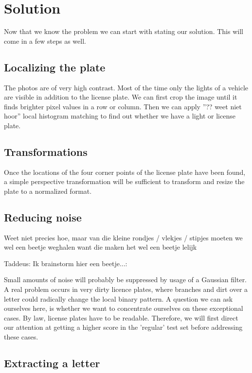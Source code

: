 \documentclass[a4paper]{article}
\begin{document}
\section{Solution}

Now that we know the problem we can start with stating our solution. This will
come in a few steps as well.

\subsection{Localizing the plate}

The photos are of very high contrast. Most of the time only the lights of a vehicle
are visible in addition to the license plate. We can first crop the image until
it finds brighter pixel values in a row or column. Then we can apply ''?? weet niet hoor'' local histogram
matching to find out whether we have a light or license plate.

\subsection{Transformations}

Once the locations of the four corner points of the license plate have been
found, a simple perspective transformation will be sufficient to transform and
resize the plate to a normalized format.

\subsection{Reducing noise}

Weet niet precies hoe, maar van die kleine rondjes / vlekjes / stipjes moeten
we wel een beetje weghalen want die maken het wel een beetje lelijk

Taddeus: Ik brainstorm hier een beetje...:

Small amounts of noise will probably be suppressed by usage of a Gaussian
filter. A real problem occurs in very dirty licence plates, where branches and
dirt over a letter could radically change the local binary pattern. A question
we can ask ourselves here, is whether we want to concentrate ourselves on
these exceptional cases. By law, license plates have to be readable.
Therefore, we will first direct our attention at getting a higher score in the
'regular' test set before addressing these cases.

\subsection{Extracting a letter}
\end{document}
